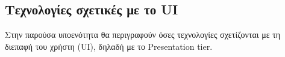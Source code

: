 \subsection{Τεχνολογίες σχετικές με το UI}

Στην παρούσα υποενότητα θα περιγραφούν όσες τεχνολογίες σχετίζονται με τη διεπαφή του χρήστη (UI), δηλαδή με το Presentation tier.

